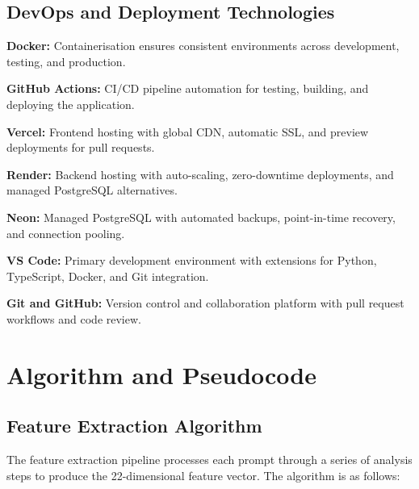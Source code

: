 \documentclass[oneside,12pt,a4paper]{report}
\begin{document}
\subsection{DevOps and Deployment Technologies}

\textbf{Docker:} Containerisation ensures consistent environments across development, testing, and production.

\textbf{GitHub Actions:} CI/CD pipeline automation for testing, building, and deploying the application.

\textbf{Vercel:} Frontend hosting with global CDN, automatic SSL, and preview deployments for pull requests.

\textbf{Render:} Backend hosting with auto-scaling, zero-downtime deployments, and managed PostgreSQL alternatives.

\textbf{Neon:} Managed PostgreSQL with automated backups, point-in-time recovery, and connection pooling.

\textbf{VS Code:} Primary development environment with extensions for Python, TypeScript, Docker, and Git integration.

\textbf{Git and GitHub:} Version control and collaboration platform with pull request workflows and code review.

\section{Algorithm and Pseudocode}

\subsection{Feature Extraction Algorithm}

The feature extraction pipeline processes each prompt through a series of analysis steps to produce the 22-dimensional feature vector. The algorithm is as follows:
\end{document}
